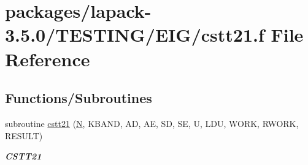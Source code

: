 \hypertarget{cstt21_8f}{}\section{packages/lapack-\/3.5.0/\+T\+E\+S\+T\+I\+N\+G/\+E\+I\+G/cstt21.f File Reference}
\label{cstt21_8f}
\subsection*{Functions/\+Subroutines}
\begin{DoxyCompactItemize}
\item 
subroutine \hyperlink{group__complex__eig_ga1bad51cd5228d6748888b32aaa29b8e4}{cstt21} (\hyperlink{polmisc_8c_a0240ac851181b84ac374872dc5434ee4}{N}, K\+B\+A\+N\+D, A\+D, A\+E, S\+D, S\+E, U, L\+D\+U, W\+O\+R\+K, R\+W\+O\+R\+K, R\+E\+S\+U\+L\+T)
\begin{DoxyCompactList}\small\item\em {\bfseries C\+S\+T\+T21} \end{DoxyCompactList}\end{DoxyCompactItemize}
